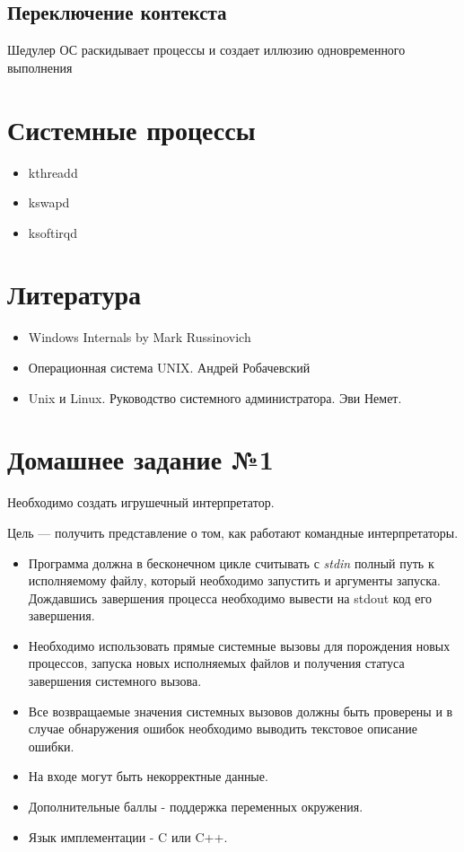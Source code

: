 \documentclass[../../lectures.tex]{subfiles}
\begin{document}
\subsection{Переключение контекста}
Шедулер ОС раскидывает процессы и создает иллюзию одновременного выполнения

\section{Системные процессы}
\begin{itemize}
    \item kthreadd
    \item kswapd
    \item ksoftirqd
\end{itemize}
\section{Литература}
\begin{itemize}
    \item Windows Internals by Mark Russinovich
    \item Операционная система UNIX. Андрей Робачевский
    \item Unix и Linux. Руководство системного администратора. Эви Немет.
\end{itemize}

\section{Домашнее задание №1} 
Необходимо создать игрушечный интерпретатор.

Цель --- получить представление о том, как работают командные интерпретаторы.
\begin{itemize}
    \item Программа должна в бесконечном цикле считывать с \emph{stdin} полный путь к
          исполняемому файлу, который необходимо запустить и аргументы запуска.
          Дождавшись завершения процесса необходимо вывести на stdout код его завершения.

    \item Необходимо использовать прямые системные вызовы для порождения новых процессов,
          запуска новых исполняемых файлов и получения статуса завершения системного
          вызова.

    \item Все возвращаемые значения системных вызовов должны быть проверены и в случае
          обнаружения ошибок необходимо выводить текстовое описание ошибки.

    \item На входе могут быть некорректные данные.

    \item Дополнительные баллы - поддержка переменных окружения.

    \item Язык имплементации - C или C++.
\end{itemize}
\end{document}
